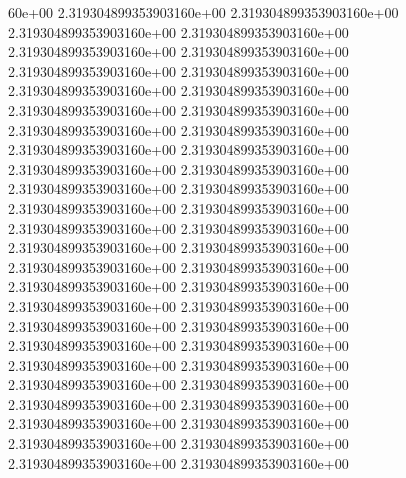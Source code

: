 60e+00	2.319304899353903160e+00	2.319304899353903160e+00	2.319304899353903160e+00	2.319304899353903160e+00	2.319304899353903160e+00	2.319304899353903160e+00	2.319304899353903160e+00	2.319304899353903160e+00	2.319304899353903160e+00	2.319304899353903160e+00	2.319304899353903160e+00	2.319304899353903160e+00	2.319304899353903160e+00	2.319304899353903160e+00	2.319304899353903160e+00	2.319304899353903160e+00	2.319304899353903160e+00	2.319304899353903160e+00	2.319304899353903160e+00	2.319304899353903160e+00	2.319304899353903160e+00	2.319304899353903160e+00	2.319304899353903160e+00	2.319304899353903160e+00	2.319304899353903160e+00	2.319304899353903160e+00	2.319304899353903160e+00	2.319304899353903160e+00	2.319304899353903160e+00	2.319304899353903160e+00	2.319304899353903160e+00	2.319304899353903160e+00	2.319304899353903160e+00	2.319304899353903160e+00	2.319304899353903160e+00	2.319304899353903160e+00	2.319304899353903160e+00	2.319304899353903160e+00	2.319304899353903160e+00	2.319304899353903160e+00	2.319304899353903160e+00	2.319304899353903160e+00	2.319304899353903160e+00	2.319304899353903160e+00	2.319304899353903160e+00	2.319304899353903160e+00	2.319304899353903160e+00	2.319304899353903160e+00
